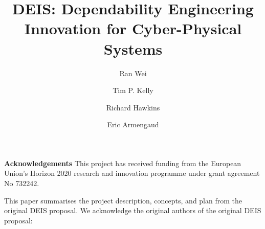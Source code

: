 \documentclass[runningheads,a4paper]{llncs}
\begin{document}
 
\title{\textbf{DEIS: Dependability Engineering Innovation for Cyber-Physical Systems}}
\author{Ran Wei \and Tim P. Kelly \and Richard Hawkins 
\and Eric Armengaud 
}
\maketitle

















\noindent\textbf{Acknowledgements}
This project has received funding from the European Union’s Horizon 2020 research and innovation programme under grant agreement No 732242. 

This paper summarises the project description, concepts, and plan from the original DEIS proposal. We acknowledge the original authors of the original DEIS proposal: 

\end{document}
